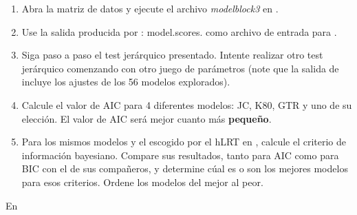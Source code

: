 \begin{enumerate}		
	\item Abra la matriz de datos  y ejecute el archivo \textit{modelblock3} en .

	\item Use la salida producida por : model.scores. como archivo de entrada para .

	\item Siga paso a paso el test jer\'arquico presentado. Intente realizar otro test jer\'arquico comenzando con otro juego de par\'ametros (note que la salida de  incluye los ajustes de los 56 modelos explorados).

	\item Calcule el valor de AIC para 4 diferentes modelos: JC, K80, GTR y uno de su elecci\'on. El valor de AIC ser\'a mejor cuanto m\'as \textbf{peque\~no}.

	\item Para los mismos modelos y el escogido por el hLRT en , calcule el criterio de informaci\'on bayesiano. Compare sus resultados, tanto para AIC como para BIC con el de sus compa\~neros, y determine c\'ual es o son los mejores modelos para esos criterios. Ordene los modelos del mejor al peor. 
\end{enumerate}




En 


